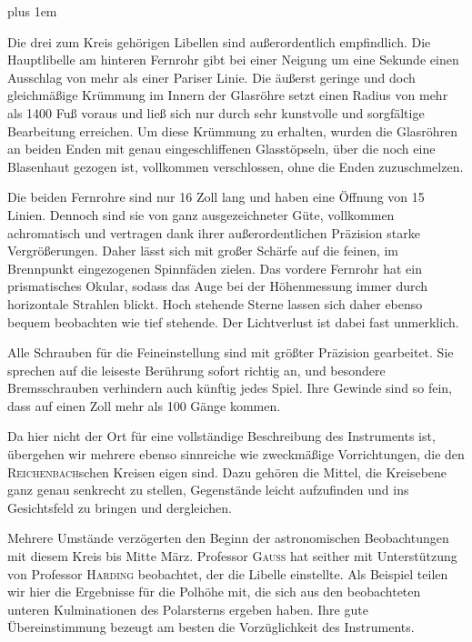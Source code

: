 \begingroup\rightskip=0pt plus 1em \par\indent Die drei zum Kreis gehörigen Libellen sind außerordentlich empfindlich. Die Hauptlibelle am hinteren Fernrohr gibt bei einer Neigung um eine Sekunde einen Ausschlag von mehr als einer Pariser Linie. Die äußerst geringe und doch gleichmäßige Krümmung im Innern der Glasröhre setzt einen Radius von mehr als 1400 Fuß voraus und ließ sich nur durch sehr kunstvolle und sorgfältige Bearbeitung erreichen. Um diese Krümmung zu erhalten, wurden die Glasröhren an beiden Enden mit genau eingeschliffenen Glasstöpseln, über die noch eine Blasenhaut gezogen ist, vollkommen verschlossen, ohne die Enden zuzuschmelzen.\par\endgroup

\par\indent Die beiden Fernrohre sind nur 16 Zoll lang und haben eine Öffnung von 15 Linien. Dennoch sind sie von ganz ausgezeichneter Güte, vollkommen achromatisch und vertragen dank ihrer außerordentlichen Präzision starke Vergrößerungen. Daher lässt sich mit großer Schärfe auf die feinen, im Brennpunkt eingezogenen Spinnfäden zielen. Das vordere Fernrohr hat ein prismatisches Okular, sodass das Auge bei der Höhenmessung immer durch horizontale Strahlen blickt. Hoch stehende Sterne lassen sich daher ebenso bequem beobachten wie tief stehende. Der Lichtverlust ist dabei fast unmerklich.

\par\indent Alle Schrauben für die Feineinstellung sind mit größter Präzision gearbeitet. Sie sprechen auf die leiseste Berührung sofort richtig an, und besondere Bremsschrauben verhindern auch künftig jedes Spiel. Ihre Gewinde sind so fein, dass auf einen Zoll mehr als 100 Gänge kommen.

\par\indent Da hier nicht der Ort für eine vollständige Beschreibung des Instruments ist, übergehen wir mehrere ebenso sinnreiche wie zweckmäßige Vorrichtungen, die den \textsc{Reichenbach}schen Kreisen eigen sind. Dazu gehören die Mittel, die Kreisebene ganz genau senkrecht zu stellen, Gegenstände leicht aufzufinden und ins Gesichtsfeld zu bringen und dergleichen.

\par\indent Mehrere Umstände verzögerten den Beginn der astronomischen Beobachtungen mit diesem Kreis bis Mitte März. Professor \textsc{Gauss} hat seither mit Unterstützung von Professor \textsc{Harding} beobachtet, der die Libelle einstellte. Als Beispiel teilen wir hier die Ergebnisse für die Polhöhe mit, die sich aus den beobachteten unteren Kulminationen des Polarsterns ergeben haben. Ihre gute Übereinstimmung bezeugt am besten die Vorzüglichkeit des Instruments.

